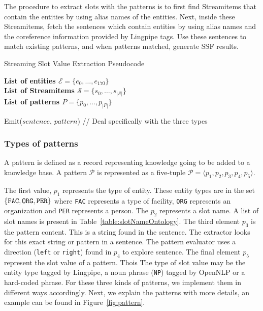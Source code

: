 The procedure to extract slots with the patterns is to 
first find Streamitems that contain the
entities by using alias names of the entities. Next, inside these Streamitems, 
fetch the sentences which contain entities by using alias names and the 
coreference information provided by Lingpipe tags. Use these sentences to 
match existing patterns, and when patterns matched, generate SSF results.

\begin{algorithm}
  \caption{Streaming Slot Value Extraction Pseudocode}
  \textbf{List of entities $\mathcal{E} = \{e_0, \ldots, e_{170}\}$}\\
  \textbf{List of Streamitems $\mathcal{S} = \{s_0, \ldots, s_{|\mathcal{S}|}\}$}\\
  \textbf{List of patterns $P = \{p_0, \ldots, p_{|P|}\}$}\\
  \begin{algorithmic}%
            \STATE Emit($sentence$, $pattern$) // Deal specifically with the three types
          \ENDIF
        \ENDFOR
      \ENDFOR
    \ENDFOR
  \end{algorithmic}
\end{algorithm}


\subsubsection{Types of patterns}
A pattern is defined as a record representing knowledge going to be added to a knowledge base.
A pattern $\mathcal{P}$ is represented as a five-tuple $\mathcal{P} = \langle p_1, p_2, p_3, p_4, p_5 \rangle$.


The first value, $p_1$ represents the type of entity. These entity types are in
the set $\{ \text{\tt FAC}, \text{\tt ORG}, \text{\tt PER} \}$ where \texttt{FAC}
represents a type of facility, \texttt{ORG} represents an organization and \texttt{PER}
represents a person.
The $p_2$ represents a slot name.
A list of slot names is present in Table~\ref{table:slotNameOntology}.
The third element $p_3$ is the pattern content. This is a string found in the sentence.
The extractor looks for this exact string or pattern in a sentence.
The pattern evaluator uses a direction (\texttt{left} or \texttt{right}) found in
$p_4$ to explore sentence.
The final element $p_5$ represent the slot value of a pattern. Thois
The type of slot value may be the entity 
type tagged by Lingpipe, a noun phrase (\texttt{NP}) tagged by OpenNLP or a hard-coded phrase. 
For these three kinds of patterns, we implement them in different 
ways accordingly. Next, we explain the patterns with more details, an
example can be found in Figure~\ref{fig:pattern}. 

